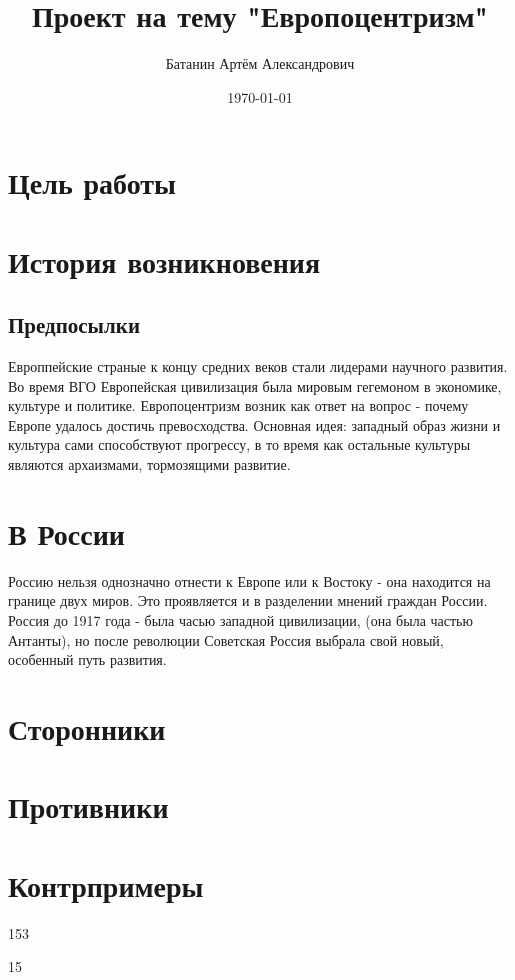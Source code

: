 \documentclass[a4paper,14pt]{article}
\title{Проект на тему "Европоцентризм"}
\author{Батанин Артём Александрович}
\date{\today}
\begin{document}
\maketitle

\newpage
\tableofcontents
\newpage



\section{Цель работы}


\section{История возникновения}

\subsection{Предпосылки}
    Европпейские страные к концу средних веков стали лидерами научного развития. Во время ВГО Европейская цивилизация
была мировым гегемоном в экономике, культуре и политике. Европоцентризм возник как ответ на вопрос - почему Европе удалось достичь
превосходства. Основная идея: западный образ жизни и культура сами способствуют прогрессу, в то время как остальные культуры являются архаизмами,
    тормозящими развитие.


\section{В России}
Россию нельзя однозначно отнести к Европе или к Востоку - она находится на границе двух миров. Это проявляется и
в разделении мнений граждан России. Россия до 1917 года - была часью западной цивилизации, (она была частью Антанты),
но после революции Советская Россия выбрала свой новый, особенный путь развития.

\section{Сторонники}


\section{Противники}

\section{Контрпримеры}

153

15
\end{document}
